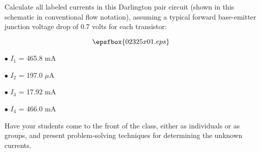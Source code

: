 

Calculate all labeled currents in this Darlington pair circuit (shown in this schematic in conventional flow notation), assuming a typical forward base-emitter junction voltage drop of 0.7 volts for each transistor:

$$\epsfbox{02325x01.eps}$$







\medskip
\goodbreak
\item{$\bullet$} $I_1$ = 465.8 mA
\item{$\bullet$} $I_2$ = 197.0 $\mu$A
\item{$\bullet$} $I_3$ = 17.92 mA
\item{$\bullet$} $I_4$ = 466.0 mA
\medskip







Have your students come to the front of the class, either as individuals or as groups, and present problem-solving techniques for determining the unknown currents.




